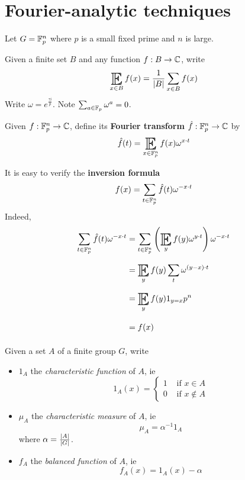 \documentclass{article}
\begin{document}
\maketitle

\tableofcontents

\clearpage
\section{Fourier-analytic techniques}

\newlec

Let $G = \mathbb F_p^n$ where $p$ is a small fixed prime and $n$ is large.

\begin{notation}
  Given a finite set $B$ and any function $f : B \to \mathbb C$, write
  $$\E_{x \in B} f(x) = \frac 1{\abs B} \sum_{x \in B} f(x)$$
  Write $\omega = e^{\frac{\tau i}p}$. Note $\sum_{a \in \mathbb F_p} \omega^a = 0$.
\end{notation}

\begin{dfn}
  Given $f : \mathbb F_p^n \to \mathbb C$, define its {\bf Fourier transform} $\hat f : \mathbb F_p^n \to \mathbb C$ by
  $$\hat f(t) = \E_{x \in \F_p^n} f(x) \omega^{x \cdot t}$$
\end{dfn}

It is easy to verify the {\bf inversion formula}
$$f(x) = \sum_{t \in \mathbb F_p^n} \hat f(t)\omega^{-x \cdot t}$$
Indeed,
\begin{align*}
  \sum_{t \in \F_p^n} \hat f(t) \omega^{-x \cdot t}
  & = \sum_{t \in \F_p^n} \left(\E_y f(y)\omega^{y \cdot t}\right) \omega^{-x \cdot t} \\
  & = \E_y f(y) \sum_t \omega^{(y - x) \cdot t} \\
  & = \E_y f(y) 1_{y = x} p^n \\
  & = f(x)
\end{align*}

\begin{notation}
  Given a set $A$ of a finite group $G$, write
  \begin{itemize}
    \item $1_A$ the {\it characteristic function} of $A$, ie
    $$1_A(x) = \begin{cases}
      1 & \text{ if } x \in A \\
      0 & \text{ if } x \nin A
    \end{cases}$$
    \item $\mu_A$ the {\it characteristic measure} of $A$, ie
    $$\mu_A = \alpha^{-1} 1_A$$
    where $\alpha = \frac{\left\lvert A\right\rvert}{\left\lvert G\right\rvert}$.
    \item $f_A$ the {\it balanced function} of $A$, ie
    $$f_A(x) = 1_A(x) - \alpha$$
  \end{itemize}
\end{notation}
\end{document}
